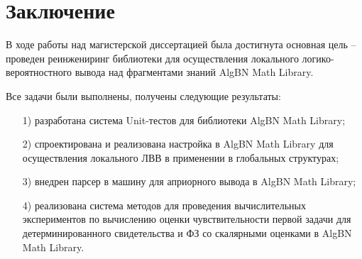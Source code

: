 \section*{Заключение}

   В ходе работы над магистерской диссертацией была достигнута основная цель -- проведен реинжениринг библиотеки для осуществления локального логико-вероятностного вывода над фрагментами знаний AlgBN Math Library. 
    
    Все задачи были выполнены, получены следующие результаты:
   \begin{enumerate}
                \item[1)] разработана система Unit-тестов для библиотеки AlgBN Math Library;
                \item[2)] спроектирована и реализована настройка в AlgBN Math Library для осуществления локального ЛВВ в применении в глобальных структурах;
                \item[3)] внедрен парсер в машину для априорного вывода в AlgBN Math Library;
                \item[4)] реализована система методов для проведения вычислительных экспериментов по вычислению оценки чувствительности первой задачи для детерминированного свидетельства и ФЗ со скалярными оценками в AlgBN Math Library.
   \end{enumerate}
    
